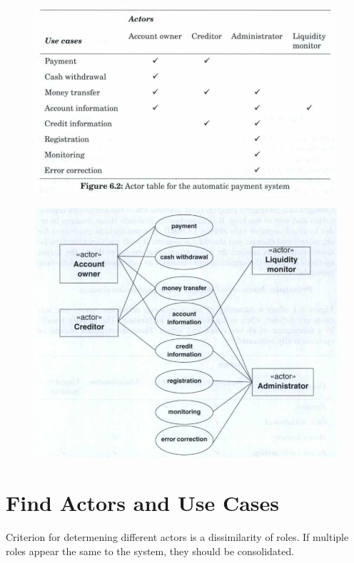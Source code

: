 
\begin{figure}[H]
    \centering
    \includegraphics[width=\linewidth*3/4]{parts/3_application_domain_analysis/1_usage/figures/use_cases.png}
\end{figure}

\begin{figure}[H]
    \centering
    \includegraphics[width=\linewidth*3/4]{parts/3_application_domain_analysis/1_usage/figures/use_cases_diagram.png}
\end{figure}

\section{Find Actors and Use Cases}
Criterion for determening different actors is a dissimilarity of roles. If multiple roles appear the same to the system, they should be consolidated.
